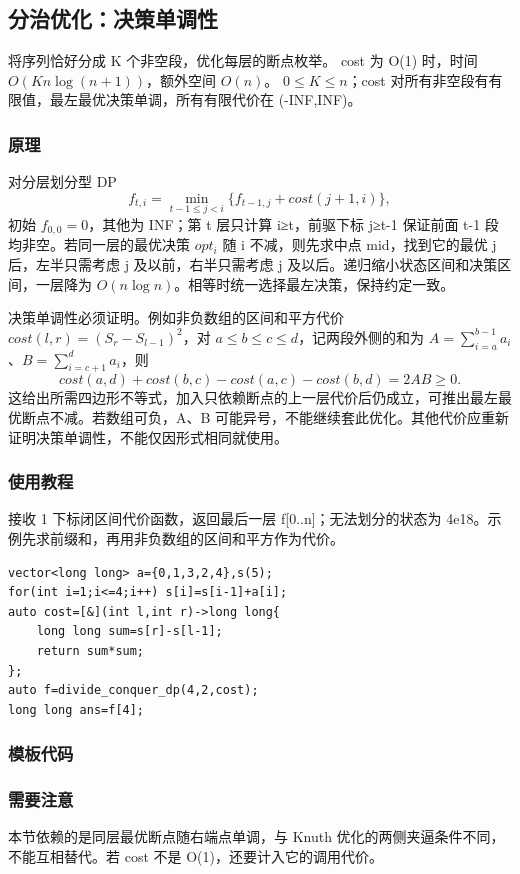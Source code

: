 \subsection{分治优化：决策单调性}
\label{dp:divide-conquer}
\AlgorithmInfo
    {将序列恰好分成 K 个非空段，优化每层的断点枚举。}
    {cost 为 O(1) 时，时间 $O(Kn\log(n+1))$，额外空间 $O(n)$。}
    {$0\le K\le n$；cost 对所有非空段有有限值，最左最优决策单调，所有有限代价在 (-INF,INF)。}
\subsubsection*{原理}

对分层划分型 DP
\[
 f_{t,i}=\min_{t-1\le j<i}\{f_{t-1,j}+cost(j+1,i)\},
\]
初始 $f_{0,0}=0$，其他为 INF；第 t 层只计算 i≥t，前驱下标 j≥t-1 保证前面 t-1 段均非空。若同一层的最优决策 $opt_i$ 随 i 不减，则先求中点 mid，找到它的最优 j 后，左半只需考虑 j 及以前，右半只需考虑 j 及以后。递归缩小状态区间和决策区间，一层降为 $O(n\log n)$。相等时统一选择最左决策，保持约定一致。

决策单调性必须证明。例如非负数组的区间和平方代价 $cost(l,r)=(S_r-S_{l-1})^2$，对 $a\le b\le c\le d$，记两段外侧的和为 $A=\sum_{i=a}^{b-1}a_i$、$B=\sum_{i=c+1}^d a_i$，则
\[
 cost(a,d)+cost(b,c)-cost(a,c)-cost(b,d)=2AB\ge0.
\]
这给出所需四边形不等式，加入只依赖断点的上一层代价后仍成立，可推出最左最优断点不减。若数组可负，A、B 可能异号，不能继续套此优化。其他代价应重新证明决策单调性，不能仅因形式相同就使用。

\subsubsection*{使用教程}
 接收 1 下标闭区间代价函数，返回最后一层 f[0..n]；无法划分的状态为 4e18。示例先求前缀和，再用非负数组的区间和平方作为代价。
\begin{lstlisting}[style=mtycpp,numbers=none]
vector<long long> a={0,1,3,2,4},s(5);
for(int i=1;i<=4;i++) s[i]=s[i-1]+a[i];
auto cost=[&](int l,int r)->long long{
	long long sum=s[r]-s[l-1];
	return sum*sum;
};
auto f=divide_conquer_dp(4,2,cost);
long long ans=f[4];
\end{lstlisting}
\subsubsection*{模板代码}
\subsubsection*{需要注意}
本节依赖的是同层最优断点随右端点单调，与 Knuth 优化的两侧夹逼条件不同，不能互相替代。若 cost 不是 O(1)，还要计入它的调用代价。
